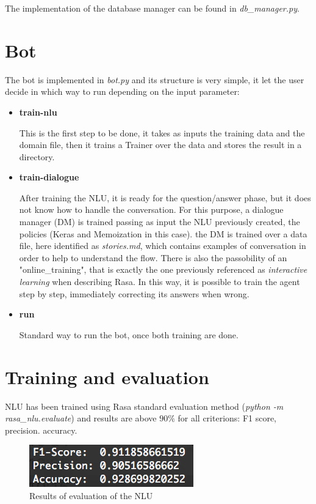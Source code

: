 \documentclass[11pt,a4paper]{article}
\begin{document}
	The implementation of the database manager can be found in \textit{db\_manager.py}.

\section{Bot}

The bot is implemented in \textit{bot.py} and its structure is very simple, it let the user decide in which way to run depending on the input parameter:\\

	\begin{itemize}
		\item {\bfseries train-nlu}
		
			This is the first step to be done, it takes as inputs the training data and the domain file, then it trains a Trainer over the data and stores the result in a directory.
		\item {\bfseries train-dialogue}
		
			After training the NLU, it is ready for the question/answer phase, but it does not know how to handle the conversation. For this purpose, a dialogue manager (DM) is trained passing as input the NLU previously created, the policies (Keras and Memoization in this case). the DM is trained over a data file, here identified as \textit{stories.md}, which contains examples of conversation in order to help to understand the flow.
			There is also the passobility of an "online\_training", that is exactly the one previously referenced as \textit{interactive learning} when describing Rasa. In this way, it is possible to train the agent step by step, immediately correcting its answers when wrong.
		\item {\bfseries run}
	
			Standard way to run the bot, once both training are done.
	\end{itemize}

\section{Training and evaluation}

NLU has been trained using Rasa standard evaluation method (\textit{python -m rasa\_nlu.evaluate}) and results are above $90\%$ for all criterions: F1 score, precision. accuracy.

\begin{figure}[h]
	\center\includegraphics[scale=1.4]{images/evaluation}
	\center\caption{Results of evaluation of the NLU}
\end{figure}
\end{document}
